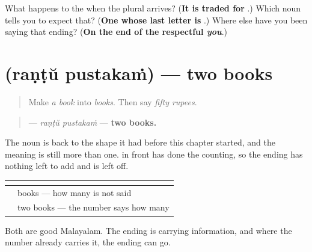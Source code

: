\begin{tcolorbox}[breakable,colback=teal!4,colframe=teal!35!black,title={Before you move on}]
What happens to the \textbf{} when the plural arrives? (\textbf{It is traded for }.) Which noun tells you to expect that? (\textbf{One whose last letter is }.) Where else have you been saying that ending? (\textbf{On the end of the respectful \emph{you}}.)
\end{tcolorbox}
\section[\texorpdfstring{\ml{രണ്ട്} \ml{പുസ്തകം} (raṇṭŭ pustakaṁ)}{രണ്ട് പുസ്തകം (raṇṭŭ pustakaṁ)}]{  (raṇṭŭ pustakaṁ) — two books}

\label{lesson:ML-C93-counted}



\begin{quote}
Make \emph{a book} into \emph{books}. Then say \emph{fifty rupees}.
\end{quote}

\begin{grammarlens}[title={Grammar Lens: the number has said it already}]
\begin{quote}
\textbf{ } — \emph{raṇṭŭ pustakaṁ} — \textbf{two books.}
\end{quote}

The noun is back to the shape it had before this chapter started, and the meaning is still more than one. \textbf{} in front has done the counting, so the ending has nothing left to add and is left off.

\noindent
\begin{tabularx}{\linewidth}{@{}>{\raggedright\arraybackslash}X>{\raggedright\arraybackslash}X@{}}
\toprule
\textbf{} & \textbf{} \\
\midrule
\textbf{\ml{പുസ്തകങ്ങൾ}} & books — how many is not said \\
\textbf{\ml{രണ്ട്} \ml{പുസ്തകം}} & two books — the number says how many \\
\bottomrule
\end{tabularx}

Both are good Malayalam. The ending is carrying information, and where the number already carries it, the ending can go.
\end{grammarlens}

